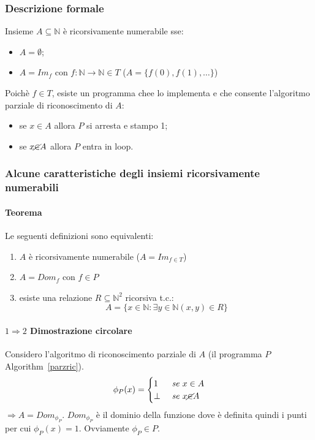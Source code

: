 \documentclass{article}
\begin{document}
\subsubsection{Descrizione formale}
Insieme $A \subseteq \mathbb{N}$ è ricorsivamente numerabile sse:
\begin{itemize}
	\item $A=\emptyset$;
	\item $A=Im_f$ con $f:\mathbb{N}\rightarrow\mathbb{N} \in T$ ($A=\{ f(0), f(1), \dots \}$)
\end{itemize}
Poichè $f \in T$, esiste un programma chee lo implementa e che consente l'algoritmo parziale di riconoscimento di $A$:
\begin{itemize}
	\item se $x \in A$ allora $P$ si arresta e stampo 1;
	\item se $x \cancel{\in} A $  allora $P$ entra in loop.
\end{itemize}

\subsubsection{Alcune caratteristiche degli insiemi ricorsivamente numerabili}
\paragraph{Teorema} Le seguenti definizioni sono equivalenti:
\begin{enumerate}
	\item $A$ è ricorsivamente numerabile ($A=Im_{f \in T}$)
	\item $A=Dom_f$ con $f \in P$
	\item esiste una relazione $R \subseteq \mathbb{N}^2$ ricorsiva t.c.:
	\begin{displaymath}
		A=\{ x \in \mathbb{N}: \exists y \in \mathbb{N} (x,y) \in R \}
	\end{displaymath}
\end{enumerate}
\paragraph{$1 \Rightarrow 2$ Dimostrazione circolare} 
Considero l'algoritmo di riconoscimento parziale di $A$ (il programma $P$ Algorithm~\ref{parzric}).
\begin{displaymath}
	\phi_P(x)=\begin{cases}
		1 &\textit{ se } x \in A \\
		\perp &\textit{ se } x \cancel{\in} A
	\end{cases}
\end{displaymath}
$\Rightarrow A=Dom_{\phi_P}$. $Dom_{\phi_P}$ è il dominio della funzione dove è definita quindi i punti per cui $\phi_P(x)=1$. Ovviamente $\phi_P \in P$.
\end{document}
